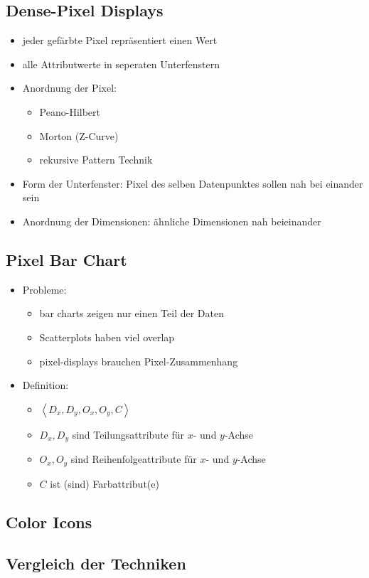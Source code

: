 \subsection{Dense-Pixel Displays}
\begin{itemize}
	\item jeder gefärbte Pixel repräsentiert einen Wert
	\item alle Attributwerte in seperaten Unterfenstern
	\item Anordnung der Pixel:
		\begin{itemize}
			\item Peano-Hilbert
			\item Morton (Z-Curve)
			\item rekursive Pattern Technik
		\end{itemize}
	\item Form der Unterfenster: Pixel des selben Datenpunktes sollen nah bei einander sein
	\item Anordnung der Dimensionen: ähnliche Dimensionen nah beieinander
\end{itemize}
\topbreak
\vspace*{-1.5\baselineskip}
\subsection{Pixel Bar Chart}
	\begin{itemize}
		\item Probleme:
			\begin{itemize}
				\item bar charts zeigen nur einen Teil der Daten
				\item Scatterplots haben viel overlap
				\item pixel-displays brauchen Pixel-Zusammenhang
			\end{itemize}
		\item Definition:
			\begin{itemize}
				\item $\left<D_x,D_y, O_x,O_y,C\right>$
				\item $D_x,D_y$ sind Teilungsattribute für $x$- und $y$-Achse
				\item $O_x,O_y$ sind Reihenfolgeattribute für $x$- und $y$-Achse
				\item $C$ ist (sind) Farbattribut(e)
			\end{itemize}
	\end{itemize}
\subsection{Color Icons}

\subsection{Vergleich der Techniken}